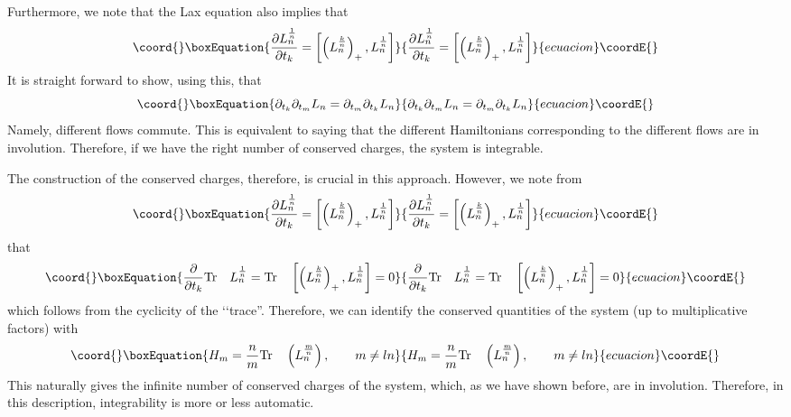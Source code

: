 \documentclass[a4paper,11pt]{article}
\begin{document}
Furthermore, we note that the Lax equation also implies that
\begin{equation}\coord{}\boxEquation{
{\partial L_{n}^{1\over n}\over \partial t_{k}} = \left[
\left(L_{n}^{k\over n}\right)_{+} , L_{n}^{1\over n} \right]
}{
{\partial L_{n}^{1\over n}\over \partial t_{k}} = \left[
\left(L_{n}^{k\over n}\right)_{+} , L_{n}^{1\over n} \right]
}{ecuacion}\coordE{}\end{equation}
It is straight forward to show, using this, that
\begin{equation}\coord{}\boxEquation{
\partial_{t_{k}} \partial_{t_{m}} L_{n} = \partial_{t_{m}}
\partial_{t_{k}} L_{n}
}{
\partial_{t_{k}} \partial_{t_{m}} L_{n} = \partial_{t_{m}}
\partial_{t_{k}} L_{n}
}{ecuacion}\coordE{}\end{equation}
Namely, different flows commute. This is equivalent to saying that the
different Hamiltonians corresponding to the different flows are in
involution. Therefore, if we have the right number of conserved
charges, the system is integrable.

The construction of the conserved charges, therefore, is crucial in
this approach. However, we note from
\begin{equation}\coord{}\boxEquation{
{\partial L_{n}^{1\over n}\over \partial t_{k}} = \left[
\left(L_{n}^{k\over n}\right)_{+} , L_{n}^{1\over n} \right]
}{
{\partial L_{n}^{1\over n}\over \partial t_{k}} = \left[
\left(L_{n}^{k\over n}\right)_{+} , L_{n}^{1\over n} \right]
}{ecuacion}\coordE{}\end{equation}
that
\begin{equation}\coord{}\boxEquation{
{\partial\over \partial t_{k}} {\rm Tr}\quad L_{n}^{1\over n} = {\rm
Tr}\quad \left[
\left(L_{n}^{k\over n}\right)_{+} , L_{n}^{1\over n} \right] = 0
}{
{\partial\over \partial t_{k}} {\rm Tr}\quad L_{n}^{1\over n} = {\rm
Tr}\quad \left[
\left(L_{n}^{k\over n}\right)_{+} , L_{n}^{1\over n} \right] = 0
}{ecuacion}\coordE{}\end{equation}
which follows from the cyclicity of the \lq\lq trace''. Therefore, we
can identify the conserved quantities of the system (up to
multiplicative factors) with
\begin{equation}\coord{}\boxEquation{
H_{m} = {n\over m} {\rm Tr}\quad \left(L_{n}^{m\over n}\right),\qquad
m \neq ln
}{
H_{m} = {n\over m} {\rm Tr}\quad \left(L_{n}^{m\over n}\right),\qquad
m \neq ln
}{ecuacion}\coordE{}\end{equation}
This naturally gives the infinite number of conserved charges of the
system, which, as we have shown before, are in involution. Therefore,
in this description, integrability is more or less automatic.
\vfill\eject
\end{document}
